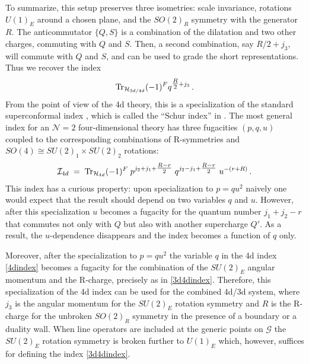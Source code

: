\documentclass[11pt,letterpaper]{article}
\numberwithin{equation}{section}
\newcommand{\be}{\begin{equation}}
\newcommand{\ee}{\end{equation}}
\newcommand{\CG}{\mathcal{G}}
\newcommand{\CH}{\mathcal{H}}
\newcommand{\CI}{\mathcal{I}}
\newcommand{\CN}{\mathcal{N}}
\newcommand{\q}{q}
\begin{document}
To summarize,
this setup preserves three isometries: scale invariance, rotations $U(1)_E$ around a chosen plane, and the $SO(2)_R$ symmetry with the generator $R$.
The anticommutator $\{Q,S\}$ is a combination of the dilatation and two other charges, commuting with $Q$ and $S$.
Then, a second combination, say $R/2 + j_3$, will commute with $Q$ and $S$, and can be used to grade the short representations.
Thus we recover the index
\begin{equation}
{\rm Tr}_{\CH_{3d/4d}} (-1)^F \q^{\tfrac{R}{2} + j_3}\,.
\label{3d4dindex}
\end{equation}
{}From the point of view of the 4d theory, this is a specialization of the standard superconformal index \cite{KMMR-index},
which is called the ``Schur index'' in \cite{GRRY}.
The most general index for an $\CN=2$ four-dimensional theory has three fugacities $(p,q,u)$
coupled to the corresponding combinations of R-symmetries and $SO(4) \cong SU(2)_1 \times SU(2)_2$ rotations:
\be
\CI_{4d} \; = \; {\rm Tr}_{\CH_{4d}} (-1)^F \; p^{j_2 + j_1 + \tfrac{R - r}{2}} \; q^{j_2 - j_1 + \tfrac{R - r}{2}} \; u^{-(r+R)}\,.
\label{4dindex}
\ee
This index has a curious property: upon specialization to $p=qu^2$ naively one would expect that
the result should depend on two variables $q$ and $u$. However, after this specialization
$u$ becomes a fugacity for the quantum number $j_1 + j_2 - r$ that commutes not only with $Q$
but also with another supercharge $Q'$.
As a result, the $u$-dependence disappears and the index becomes a function of $q$ only.

Moreover, after the specialization to $p=qu^2$ the variable $q$ in the 4d index \eqref{4dindex}
becomes a fugacity for the combination of the $SU(2)_E$ angular momentum and the R-charge,
precisely as in \eqref{3d4dindex}.
Therefore, this specialization of the 4d index can be used for the combined 4d/3d system,
where $j_3$ is the angular momentum for the $SU(2)_E$ rotation symmetry and $R$ is the R-charge
for the unbroken $SO(2)_R$ symmetry in the presence of a boundary or a duality wall.
When line operators are included at the generic points on $\CG$ the $SU(2)_E$ rotation symmetry
is broken further to $U(1)_E$ which, however, suffices for defining the index \eqref{3d4dindex}.
\end{document}
